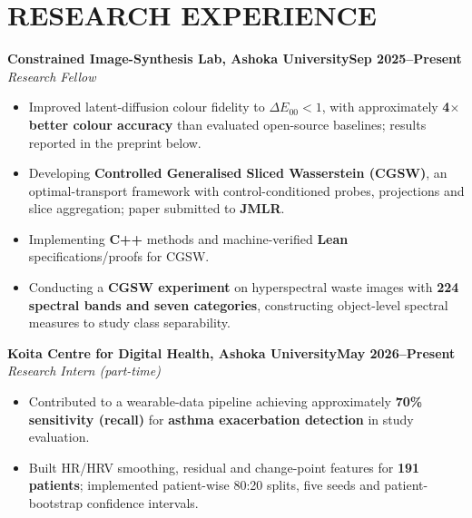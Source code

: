 \documentclass[10pt,a4paper]{article}
\newcommand{\entry}[3]{\noindent\textbf{#1}\hfill\textbf{#3}\\[-1pt]\textit{#2}\par}
\newenvironment{cvitems}{\begin{itemize}[leftmargin=1.1em,label=\textbullet,itemsep=2pt,topsep=3pt,parsep=0pt,partopsep=0pt]}{\end{itemize}}
\begin{document}
\section{RESEARCH EXPERIENCE}
\entry{Constrained Image-Synthesis Lab, Ashoka University}{Research Fellow}{Sep 2025--Present}
\begin{cvitems}
  \item Improved latent-diffusion colour fidelity to $\Delta E_{00}<1$, with approximately \textbf{4$\times$ better colour accuracy} than evaluated open-source baselines; results reported in the preprint below.
  \item Developing \textbf{Controlled Generalised Sliced Wasserstein (CGSW)}, an optimal-transport framework with control-conditioned probes, projections and slice aggregation; paper submitted to \textbf{JMLR}.
  \item Implementing \textbf{C++} methods and machine-verified \textbf{Lean} specifications/proofs for CGSW.
  \item Conducting a \textbf{CGSW experiment} on hyperspectral waste images with \textbf{224 spectral bands and seven categories}, constructing object-level spectral measures to study class separability.
\end{cvitems}
\entry{Koita Centre for Digital Health, Ashoka University}{Research Intern (part-time)}{May 2026--Present}
\begin{cvitems}
  \item Contributed to a wearable-data pipeline achieving approximately \textbf{70\% sensitivity (recall)} for \textbf{asthma exacerbation detection} in study evaluation.
  \item Built HR/HRV smoothing, residual and change-point features for \textbf{191 patients}; implemented patient-wise 80:20 splits, five seeds and patient-bootstrap confidence intervals.
\end{cvitems}
\end{document}
